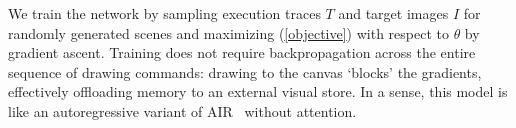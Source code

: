 \documentclass{article}
\newcommand{\remark}[1]{\textcolor{red}{[#1]}}
\begin{document}
We train the network by sampling execution traces $T$ and target
images $I$ for randomly generated scenes
and maximizing
(\ref{objective}) with respect to $\theta$ by gradient ascent.
Training does not require backpropagation across the entire sequence of drawing commands:
drawing to the canvas `blocks' the gradients,
effectively offloading memory to an external visual store.
In a sense, this model is like an autoregressive variant of AIR~\cite{eslami1603attend} without attention.

\end{document}
